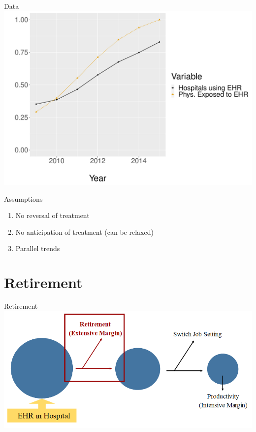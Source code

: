 \documentclass[10pt]{beamer}
\begin{document}
\begin{frame}{Data}
\centering
\includegraphics[scale=.4]{Objects/sum_stats_year.pdf}
\end{frame}


\begin{frame}{Assumptions}
\begin{enumerate}
    \item No reversal of treatment
                \vspace{3mm}
    \item No anticipation of treatment (can be relaxed)
                \vspace{3mm}
    \item Parallel trends
\end{enumerate} 
\end{frame}


\section{Retirement}


\begin{frame}{Retirement}
\centering
\includegraphics[scale=.4]{Objects/EHR_FlowChart_Retire.PNG}
\end{frame}
\end{document}

